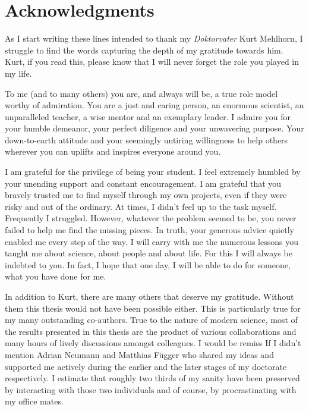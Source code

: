 \null\vfill

\section*{Acknowledgments}
	
	As I start writing these lines intended to thank my \emph{Doktorvater} Kurt Mehlhorn, I struggle to find the words capturing the depth of my gratitude towards him. Kurt, if you read this, please know that I will never forget the role you played in my life.

	To me (and to many others) you are, and always will be, a true role model worthy of admiration. You are a just and caring person, an enormous scientist, an unparalleled teacher, a wise mentor and an exemplary leader. I admire you for your humble demeanor, your perfect diligence and your unwavering purpose. Your down-to-earth attitude and your seemingly untiring willingness to help others wherever you can uplifts and inspires everyone around you.

	I am grateful for the privilege of being your student. I feel extremely humbled by your unending support and constant encouragement. I am grateful that you bravely trusted me to find myself through my own projects, even if they were risky and out of the ordinary. At times, I didn't feel up to the task myself. Frequently I struggled. However, whatever the problem seemed to be, you never failed to help me find the missing pieces. In truth, your generous advice quietly enabled me every step of the way. I will carry with me the numerous lessons you taught me about science, about people and about life. For this I will always be indebted to you. In fact, I hope that one day, I will be able to do for someone, what you have done for me.\bigskip
	
	In addition to Kurt, there are many others that deserve my gratitude. Without them this thesis would not have been possible either. This is particularly true for my many outstanding co-authors. True to the nature of modern science, most of the results presented in this thesis are the product of various collaborations and many hours of lively discussions amongst colleagues. I would be remiss If I didn't mention Adrian Neumann and Matthias F\"ugger who shared my ideas and supported me actively during the earlier and the later stages of my doctorate respectively. I estimate that roughly two thirds of my sanity have been preserved by interacting with those two individuals and of course, by procrastinating with my office mates.\bigskip

